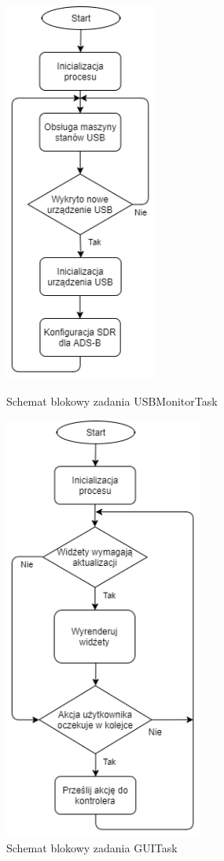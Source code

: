 \documentclass[eng,printmode]{mgr}
\begin{document}
\begin{figure}[htb]
\centering
\begin{minipage}[c]{0.45\linewidth}
\centering
\includegraphics[width=5cm]{plots/usbTask.png}
\vskip 1.3cm
\caption{Schemat blokowy zadania USBMonitorTask}
\end{minipage}
\hfill
\begin{minipage}[c]{0.45\linewidth}
\centering
\includegraphics[width=6.5cm]{plots/guiTask.png}
\caption{Schemat blokowy zadania GUITask}
\end{minipage}
\end{figure}
\end{document}
